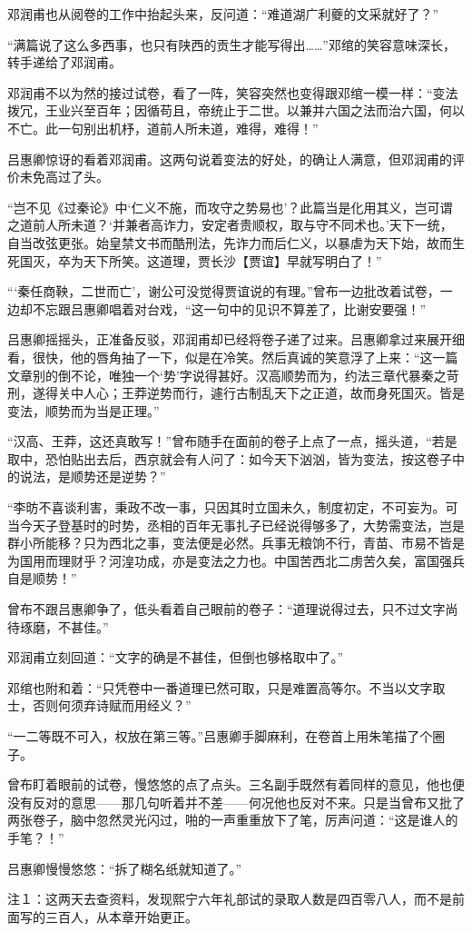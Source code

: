 邓润甫也从阅卷的工作中抬起头来，反问道：“难道湖广利夔的文采就好了？”

“满篇说了这么多西事，也只有陕西的贡生才能写得出……”邓绾的笑容意味深长，转手递给了邓润甫。

邓润甫不以为然的接过试卷，看了一阵，笑容突然也变得跟邓绾一模一样：“变法拨冗，王业兴至百年；因循苟且，帝统止于二世。以兼并六国之法而治六国，何以不亡。此一句别出机杼，道前人所未道，难得，难得！”

吕惠卿惊讶的看着邓润甫。这两句说着变法的好处，的确让人满意，但邓润甫的评价未免高过了头。

“岂不见《过秦论》中‘仁义不施，而攻守之势易也’？此篇当是化用其义，岂可谓之道前人所未道？‘并兼者高诈力，安定者贵顺权，取与守不同术也。’天下一统，自当改弦更张。始皇禁文书而酷刑法，先诈力而后仁义，以暴虐为天下始，故而生死国灭，卒为天下所笑。这道理，贾长沙【贾谊】早就写明白了！”

“‘秦任商鞅，二世而亡’，谢公可没觉得贾谊说的有理。”曾布一边批改着试卷，一边却不忘跟吕惠卿唱着对台戏，“这一句中的见识不算差了，比谢安要强！”

吕惠卿摇摇头，正准备反驳，邓润甫却已经将卷子递了过来。吕惠卿拿过来展开细看，很快，他的唇角抽了一下，似是在冷笑。然后真诚的笑意浮了上来：“这一篇文章别的倒不论，唯独一个‘势’字说得甚好。汉高顺势而为，约法三章代暴秦之苛刑，遂得关中人心；王莽逆势而行，遽行古制乱天下之正道，故而身死国灭。皆是变法，顺势而为当是正理。”

“汉高、王莽，这还真敢写！”曾布随手在面前的卷子上点了一点，摇头道，“若是取中，恐怕贴出去后，西京就会有人问了：如今天下汹汹，皆为变法，按这卷子中的说法，是顺势还是逆势？”

“李昉不喜谈利害，秉政不改一事，只因其时立国未久，制度初定，不可妄为。可当今天子登基时的时势，丞相的百年无事扎子已经说得够多了，大势需变法，岂是群小所能移？只为西北之事，变法便是必然。兵事无粮饷不行，青苗、市易不皆是为国用而理财乎？河湟功成，亦是变法之力也。中国苦西北二虏苦久矣，富国强兵自是顺势！”

曾布不跟吕惠卿争了，低头看着自己眼前的卷子：“道理说得过去，只不过文字尚待琢磨，不甚佳。”

邓润甫立刻回道：“文字的确是不甚佳，但倒也够格取中了。”

邓绾也附和着：“只凭卷中一番道理已然可取，只是难置高等尔。不当以文字取士，否则何须弃诗赋而用经义？”

“一二等既不可入，权放在第三等。”吕惠卿手脚麻利，在卷首上用朱笔描了个圈子。

曾布盯着眼前的试卷，慢悠悠的点了点头。三名副手既然有着同样的意见，他也便没有反对的意思——那几句听着并不差——何况他也反对不来。只是当曾布又批了两张卷子，脑中忽然灵光闪过，啪的一声重重放下了笔，厉声问道：“这是谁人的手笔？！”

吕惠卿慢慢悠悠：“拆了糊名纸就知道了。”

注１：这两天去查资料，发现熙宁六年礼部试的录取人数是四百零八人，而不是前面写的三百人，从本章开始更正。

